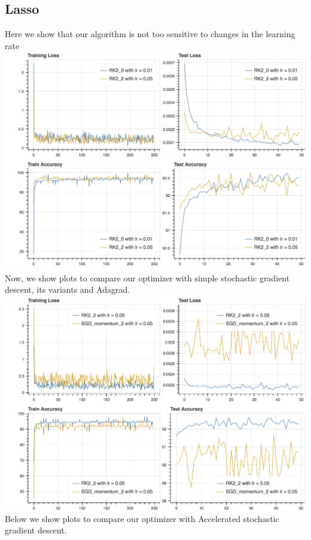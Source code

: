 \subsection{Lasso}
Here we show that our algorithm is not too sensitive to changes in the learning rate
\\
\includegraphics[scale=0.4]{plots/lasso_4.png}
\\
Now, we show plots to compare our optimizer with simple stochastic gradient descent, its variants and Adagrad.
\\
\includegraphics[scale=0.4]{plots/lasso_3.png}
\\
Below we show plots to compare our optimizer with Accelerated stochastic gradient descent.
\\
